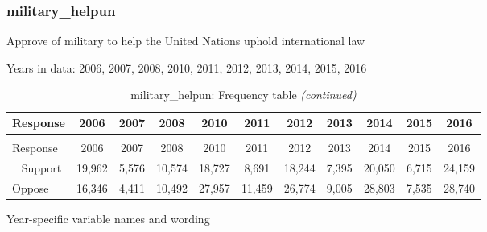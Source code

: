 \documentclass[12pt]{article}
\begin{document}
\subsubsection{military\_helpun}\label{military_helpun}

Approve of military to help the United Nations uphold international law

Years in data: 2006, 2007, 2008, 2010, 2011, 2012, 2013, 2014, 2015,
2016\begingroup\fontsize{10}{12}\selectfont

\begin{longtable}[t]{lcccccccccc}
\caption{\label{tab:unnamed-chunk-4}military\_helpun: Frequency table}\\
\toprule
Response & 2006 & 2007 & 2008 & 2010 & 2011 & 2012 & 2013 & 2014 & 2015 & 2016\\
\midrule
\endfirsthead
\caption[]{military\_helpun: Frequency table \textit{(continued)}}\\
\toprule
Response & 2006 & 2007 & 2008 & 2010 & 2011 & 2012 & 2013 & 2014 & 2015 & 2016\\
\midrule
\endhead
\
\endfoot
\bottomrule
\endlastfoot
Support & 19,962 & 5,576 & 10,574 & 18,727 & 8,691 & 18,244 & 7,395 & 20,050 & 6,715 & 24,159\\
Oppose & 16,346 & 4,411 & 10,492 & 27,957 & 11,459 & 26,774 & 9,005 & 28,803 & 7,535 & 28,740\\*
\end{longtable}

\endgroup{}

Year-specific variable names and wording
\end{document}
